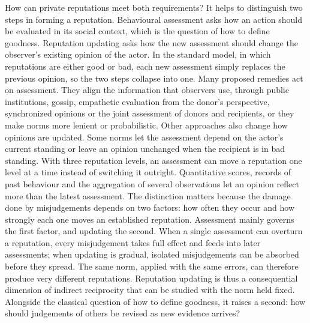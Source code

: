 How can private reputations meet both requirements? It helps to distinguish two steps in forming a reputation. Behavioural assessment asks how an action should be evaluated in its social context, which is the question of how to define goodness\cite{ohtsuki2004}. Reputation updating asks how the new assessment should change the observer's existing opinion of the actor. In the standard model, in which reputations are either good or bad, each new assessment simply replaces the previous opinion, so the two steps collapse into one. Many proposed remedies act on assessment. They align the information that observers use, through public institutions\cite{radzvilavicius2021}, gossip\cite{kawakatsu2024}, empathetic evaluation from the donor's perspective\cite{radzvilavicius2019}, synchronized opinions\cite{murase2024synchronization} or the joint assessment of donors and recipients\cite{tham2026}, or they make norms more lenient or probabilistic\cite{okada2020dilemmas,schmid2021,okada2024,murase2023}. Other approaches also change how opinions are updated. Some norms let the assessment depend on the actor's current standing\cite{ohtsuki2004,santos2018} or leave an opinion unchanged when the recipient is in bad standing\cite{sasaki2017,okada2018}. With three reputation levels, an assessment can move a reputation one level at a time instead of switching it outright\cite{tanabe2013,murase2022,yamamoto2025}. Quantitative scores\cite{schmid2023}, records of past behaviour\cite{clark2020} and the aggregation of several observations\cite{michelmata2024} let an opinion reflect more than the latest assessment. The distinction matters because the damage done by misjudgements depends on two factors: how often they occur and how strongly each one moves an established reputation. Assessment mainly governs the first factor, and updating the second. When a single assessment can overturn a reputation, every misjudgement takes full effect and feeds into later assessments; when updating is gradual, isolated misjudgements can be absorbed before they spread. The same norm, applied with the same errors, can therefore produce very different reputations. Reputation updating is thus a consequential dimension of indirect reciprocity that can be studied with the norm held fixed. Alongside the classical question of how to define goodness, it raises a second: how should judgements of others be revised as new evidence arrives?

